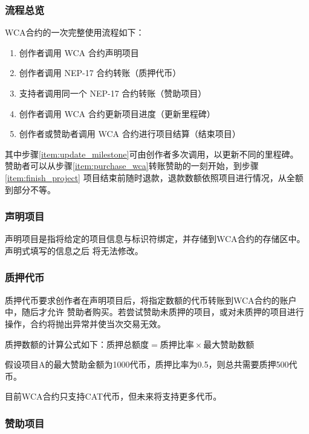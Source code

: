 \subsubsection{流程总览}

WCA合约的一次完整使用流程如下：

\begin{enumerate}
    \item 创作者调用 WCA 合约声明项目
    \item 创作者调用 NEP-17 合约转账（质押代币）
    \item 支持者调用同一个 NEP-17 合约转账（赞助项目）\label{item:purchase_wca}
    \item 创作者调用 WCA 合约更新项目进度（更新里程碑）\label{item:update_milestone}
    \item 创作者或赞助者调用 WCA 合约进行项目结算（结束项目）\label{item:finish_project}
\end{enumerate}

其中步骤\ref{item:update_milestone}可由创作者多次调用，以更新不同的里程碑。
赞助者可以从步骤\ref{item:purchase_wca}转账赞助的一刻开始，到步骤\ref{item:finish_project}
项目结束前随时退款，退款数额依照项目进行情况，从全额到部分不等。

\subsubsection{声明项目}

声明项目是指将给定的项目信息与标识符绑定，并存储到WCA合约的存储区中。声明式填写的信息之后
将无法修改。

\subsubsection{质押代币}

质押代币要求创作者在声明项目后，将指定数额的代币转账到WCA合约的账户中，随后才允许
赞助者购买。若尝试赞助未质押的项目，或对未质押的项目进行操作，合约将抛出异常并使当次交易无效。

质押数额的计算公式如下：$\text{质押总额度} = \text{质押比率} \times \text{最大赞助数额}$

假设项目A的最大赞助金额为1000代币，质押比率为0.5，则总共需要质押500代币。

目前WCA合约只支持CAT代币，但未来将支持更多代币。

\subsubsection{赞助项目}

